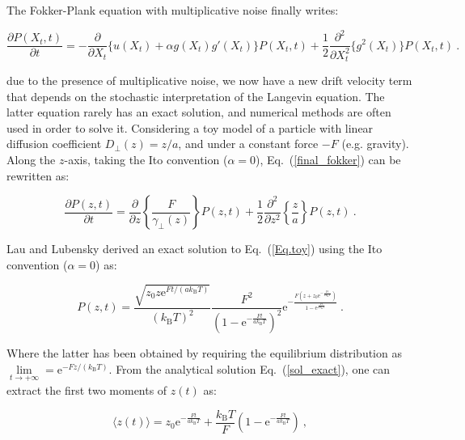 The Fokker-Plank equation with multiplicative noise finally writes:

\begin{equation}
	\frac{\partial P(X_t, t)}{\partial t} = -\frac{\partial}{\partial X_t} \{u(X_t) + \alpha g(X_t)g'(X_t)\} P(X_t, t) + \frac{1}{2}\frac{\partial^2}{\partial X_t^2} \{g^2(X_t) \} P(X_t, t)~.
	\label{final_fokker}
\end{equation} 

due to the presence of multiplicative noise, we now have a new drift velocity term that depends on the stochastic interpretation of the Langevin equation. The latter equation rarely has an exact solution, and numerical methods are often used in order to solve it. Considering a toy model of a particle with linear diffusion coefficient $D_\bot(z) = z/a$, and under a constant force $-F$ (e.g. gravity). Along the $z$-axis, taking the Ito convention ($\alpha = 0$), Eq.~(\ref{final_fokker}) can be rewritten as:

\begin{equation}
	\frac{\partial P(z, t)}{\partial t}=  \frac{\partial}{\partial z} \left\{ \frac{F}{\gamma_\bot(z)}\right\} P(z, t) + \frac{1}{2}\frac{\partial^2}{\partial z^2} \left\{\frac{z}{a} \right\} P(z, t)~.
	\label{Eq.toy}
\end{equation}

Lau and Lubensky \cite{lau_state-dependent_2007} derived an exact solution to Eq.~(\ref{Eq.toy}) using the Ito convention ($\alpha = 0$) as:

\begin{equation}
	P(z,t) = \frac{\sqrt{z_0z\mathrm{e}^{Ft/(ak_\mathrm{B}T)}}}{(k_\mathrm{B}T)^2} \frac{F^2}{\left(1 - \mathrm{e}^{-\frac{Ft}{ak_\mathrm{B}T}}\right) ^2} \mathrm{e}^{-\frac{F\left(z + z_0 \mathrm{e}^{-\frac{Ft}{ak_\mathrm{B}T}}\right)}{1 - \mathrm{e}^{\frac{Ft}{ak_\mathrm{B}T}}}} ~.
	\label{sol_exact}
\end{equation}

Where the latter has been obtained by requiring the equilibrium distribution as $\lim\limits_{t\rightarrow+\infty} = \mathrm{e}^{-Fz/(k_\mathrm{B}T)}$. From the analytical solution Eq.~(\ref{sol_exact}), one can extract the first two moments of $z(t)$ as:

\begin{equation}
	\langle z (t)\rangle = z_0 \mathrm{e}^{-\frac{Ft}{ak_\mathrm{B}T}} + \frac{k_\mathrm{B}T}{F}\left(1 - \mathrm{e}^{-\frac{Ft}{ak_\mathrm{B}T}}\right)~,
\end{equation}

